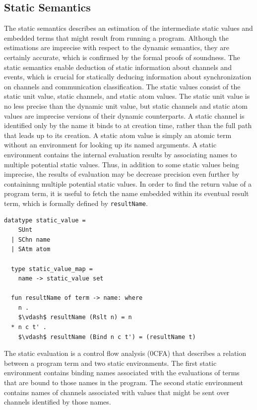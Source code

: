 \documentclass[letterpaper, 11pt]{extarticle}
\begin{document}
\subsection{Static Semantics}

The static semantics describes an estimation of the intermediate static values and embedded terms
that might result from running a program. Although the estimations are imprecise with
respect to the dynamic semantics, they are certainly accurate,
which is confirmed by the formal proofs of soundness.
The static semantics enable deduction of static information about channels and events, which is
crucial for statically deducing information about synchronization on channels and
communication classification.
The static values consist of the static unit value, static channels, and static atom
values. The static unit value is no less precise than the dynamic unit value, but
static channels and static atom values are imprecise versions of their dynamic
counterparts. A static channel is identified only by the name it binds to at creation time,
rather than the full path that leads up to its creation. A static atom value is simply an
atomic term without an environment for looking up its named arguments. A static
environment contains the internal evaluation results by
associating names to multiple potential static values.
Thus, in addition to some static values being imprecise,
the results of evaluation may be decrease precision even further
by containinng multiple potential static values. 
In order to find the return value of a program term, it is useful to fetch the name
embedded within its eventual result term, which is formally defined by \lstinline{resultName}.

\begin{lstlisting}[language=logic, mathescape]
  datatype static_value =
    SUnt
  | SChn name
  | SAtm atom 

  type static_value_map =
    name -> static_value set

  fun resultName of term -> name: where
    n .
    $\vdash$ resultName (Rslt n) = n
  * n c t' . 
    $\vdash$ resultName (Bind n c t') = (resultName t)
\end{lstlisting}

The static evaluation is a control flow analysis (0CFA)
that describes a relation between a program term and two static environments.
The first static environment contains binding names associated with the
evaluations of terms that are bound to those names in the program.
The second static environment contains names of channels associated
with values that might be sent over channels identified by those names.
\end{document}
